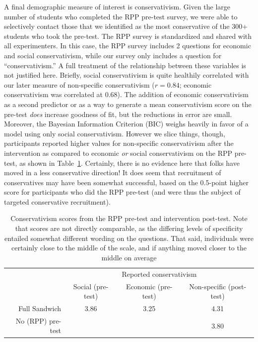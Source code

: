 A final demographic measure of interest is conservativism. Given the large
number of students who completed the RPP pre-test survey, we were able to
selectively contact those that we identified as the most conservative of the
300+ students who took the pre-test. The RPP survey is standardized and shared
with all experimenters. In this case, the RPP survey includes 2 questions for
economic and social conservativism, while our survey only includes a question
for “conservativism.” A full treatment of the relationship between these
variables is not justified here. Briefly, social conservativism is quite
healthily correlated with our later measure of non-specific conservativism ($r =
0.84$; economic conservativism was correlated at 0.68). The addition of economic
conservativism as a second predictor or as a way to generate a mean
conservativism score on the pre-test \emph{does} increase goodness of fit, but
the reductions in error are small. Moreover, the Bayesian Information Criterion
(BIC) weighs heavily in favor of a model using only social conservativism.
However we slice things, though, participants reported higher values for
non-specific conservativism after the intervention as compared to economic
\emph{or} social conservativism on the RPP pre-test, as shown in
Table~\ref{table:mech-rpp-cons}. Certainly, there is no evidence here that folks
have moved in a less conservative direction! It does seem that recruitment of
conservatives may have been somewhat successful, based on the 0.5-point higher
score for participants who did the RPP pre-test (and were thus the subject of
targeted conservative recruitment).

\begin{table}
    \caption{Conservativism scores from the RPP pre-test and intervention
        post-test. Note that scores are not directly comparable, as the
        differing levels of specificity entailed somewhat different wording on
        the questions. That said, individuals were certainly close to the middle
        of the scale, and if anything moved closer to the middle on average}
    \label{table:mech-rpp-cons}
\centering
\begin{tabular}{rccc}
  \toprule
   & \multicolumn{3}{c}{Reported conservativism} \\
   & Social (pre-test) & Economic (pre-test) & Non-specific (post-test) \\ 
  \midrule
  Full Sandwich & 3.86 & 3.25 & 4.31 \\
  No (RPP) pre-test & & & 3.80 \\
  \bottomrule
\end{tabular}
\end{table}

